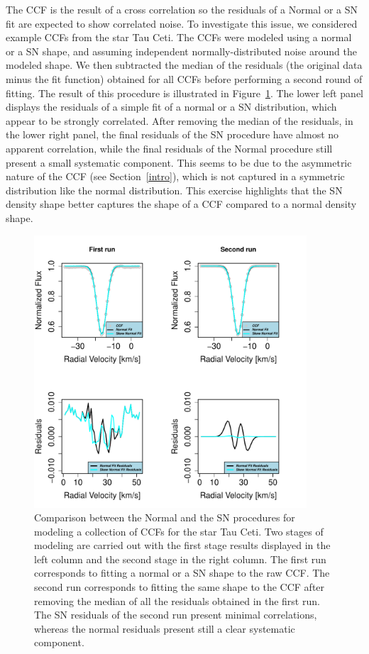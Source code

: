 \documentclass[11pt, oneside]{article}
\begin{document}
The CCF is the result of a cross correlation so the residuals of a Normal or a SN fit are expected to show correlated noise.
To investigate this issue, we considered example CCFs from the star Tau Ceti.  The CCFs were modeled using a normal or a SN shape, and assuming independent normally-distributed noise around the modeled shape. 
%
We then subtracted the median of the residuals (the original data minus the fit function) obtained for all CCFs before performing a second round of fitting. The result of this procedure is illustrated in Figure~\ref{fig:Residual.comparison}. The lower left panel displays the residuals of a simple fit of a normal or a SN distribution, which appear to be strongly correlated. 
%
After removing the median of the residuals, in the lower right panel, the final residuals of the SN procedure have almost no apparent correlation, while the final residuals of the Normal procedure still present a small systematic component. This seems to be due to the asymmetric nature of the CCF (see Section~\ref{intro}), which is not captured in a symmetric distribution like the normal distribution.  This exercise highlights that the SN density shape better captures the shape of a CCF compared to a normal density shape.
%
\begin{figure}[htbp]
   \centering
\includegraphics[height = 4in]{[1]Plot_Fitting_and_Residuals_2run.pdf} 
   \caption{Comparison between the Normal and the SN procedures for modeling a collection of CCFs for the star Tau Ceti.  Two stages of modeling are carried out with the first stage results displayed in the left column and the second stage in the right column.
   The first run corresponds to fitting a normal or a SN shape to the raw CCF. The second run corresponds to fitting the same shape to the CCF after removing the median of all the residuals obtained in the first run. The SN residuals of the second run present minimal correlations, whereas the normal residuals present still a clear systematic component.}
   \label{fig:Residual.comparison}
\end{figure}
\end{document}
